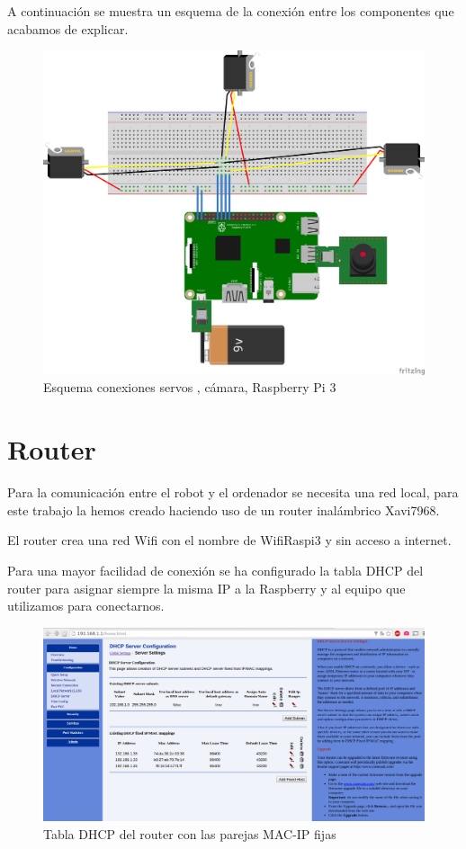 \documentclass[twoside, 11pt]{epstfg}
\begin{document}
A continuación se muestra un esquema de la conexión entre los componentes que acabamos de explicar.


\begin{figure}[h]
	\centerline{
		\mbox{\includegraphics[width=.95\textwidth]{images/EsquemaServos.png}}
	}
	\caption{Esquema conexiones servos , cámara, Raspberry Pi 3}
\end{figure}


\section{Router}
Para la comunicación entre el robot y el ordenador se necesita una red local,  para este trabajo la hemos creado haciendo uso de un router inalámbrico Xavi7968.

El router crea una red Wifi con el nombre de WifiRaspi3 y sin acceso a internet.

Para una mayor facilidad de conexión se ha configurado la tabla DHCP del router para asignar siempre la misma IP a la Raspberry y al equipo que utilizamos para conectarnos.

\begin{figure}[h]
	\centerline{
		\mbox{\includegraphics[width=.95\textwidth]{images/TablaDHCP2.png}}
	}
	\caption{Tabla DHCP del router con las parejas MAC-IP fijas}
\end{figure}
\end{document}
